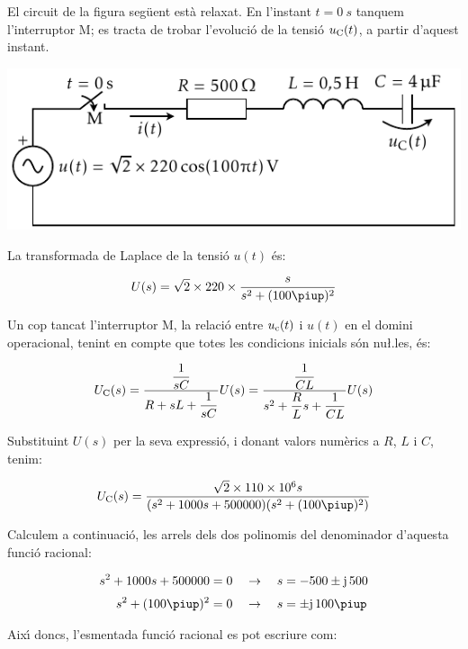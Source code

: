 \begin{exemple}
    El circuit de la figura seg\"{u}ent est\`{a} relaxat. En l'instant $t=\SI{0}{s}$
    tanquem l'interruptor M; es tracta de trobar l'evoluci\'{o} de la tensi\'{o}
    $u_\mathrm{C}(t)$, a partir d'aquest instant.

    \begin{center}
        \includegraphics{Imatges/Cap-Laplace-Exemple4-Circuit.pdf}
    \end{center}

    La transformada de Laplace de la tensi\'{o} $u(t)$ \'{e}s:

    \[
        U(s) = \sqrt{2}\times 220\times \frac{s}{s^2 + (100\piup)^2}
    \]

    Un cop tancat l'interruptor M, la relaci\'{o} entre $u_\mathrm{c}(t)$ i
    $u(t)$ en el domini operacional, tenint en compte que totes les
    condicions inicials s\'{o}n nu{\l.l}es, \'{e}s:

    \[
        U_\mathrm{C}(s) = \frac{\dfrac{1}{sC}}{R+ sL +\dfrac{1}{sC}} U(s)=
        \frac{\dfrac{1}{CL}}{s^2 + \dfrac{R}{L}s +\dfrac{1}{CL}} U(s)
    \]

    Substituint $U(s)$ per la seva expressi\'{o}, i donant valors num\`{e}rics a
    $R$, $L$ i $C$, tenim:

    \[
        U\ped{C}(s) = \frac{\sqrt{2}\times 110\times 10^6 s}{(s^2 + 1000 s + 500000)(s^2 + (100\piup)^2)}
    \]

    Calculem a continuaci\'{o}, les arrels dels dos polinomis  del
    denominador d'aquesta funci\'{o} racional:

    \begin{align*}
        s^2 + 1000 s + 500000 &= 0 \quad\rightarrow\quad s = -500
        \pm\ju\,500 \\[0.5ex]
        s^2 + (100\piup)^2 &= 0 \quad\rightarrow\quad s = \pm\ju\,100\piup
    \end{align*}

    Aix\'{\i} doncs, l'esmentada funci\'{o} racional es pot escriure com:


\end{exemple}
